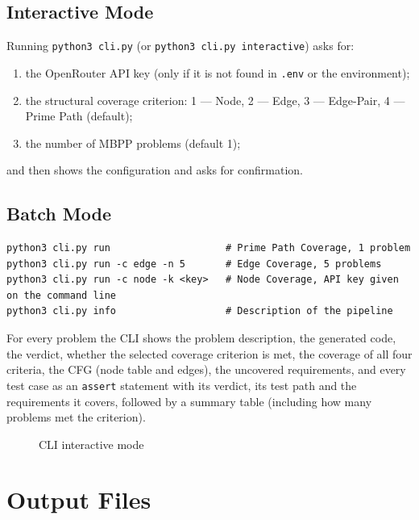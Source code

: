 \documentclass[12pt, a4paper]{article}
\begin{document}
\subsection{Interactive Mode}

Running \texttt{python3 cli.py} (or \texttt{python3 cli.py interactive}) asks for:
\begin{enumerate}[nosep]
    \item the OpenRouter API key (only if it is not found in \texttt{.env} or the environment);
    \item the structural coverage criterion: 1 --- Node, 2 --- Edge, 3 --- Edge-Pair, 4 --- Prime Path (default);
    \item the number of MBPP problems (default 1);
\end{enumerate}
and then shows the configuration and asks for confirmation.

\subsection{Batch Mode}

\begin{lstlisting}[style=plain]
python3 cli.py run                    # Prime Path Coverage, 1 problem
python3 cli.py run -c edge -n 5       # Edge Coverage, 5 problems
python3 cli.py run -c node -k <key>   # Node Coverage, API key given on the command line
python3 cli.py info                   # Description of the pipeline
\end{lstlisting}

For every problem the CLI shows the problem description, the generated code, the verdict, whether the selected coverage criterion is met, the coverage of all four criteria, the CFG (node table and edges), the uncovered requirements, and every test case as an \texttt{assert} statement with its verdict, its test path and the requirements it covers, followed by a summary table (including how many problems met the criterion).

\begin{figure}[H]
    \centering
    \caption{CLI interactive mode}
\end{figure}

\section{Output Files}
\end{document}
